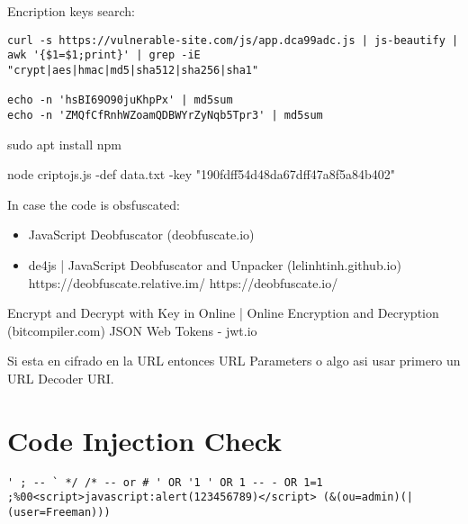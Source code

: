 Encription keys search:
\begin{lstlisting}[numbers=none]
curl -s https://vulnerable-site.com/js/app.dca99adc.js | js-beautify | awk '{$1=$1;print}' | grep -iE  "crypt|aes|hmac|md5|sha512|sha256|sha1"

echo -n 'hsBI69O90juKhpPx' | md5sum 
echo -n 'ZMQfCfRnhWZoamQDBWYrZyNqb5Tpr3' | md5sum
\end{lstlisting}

sudo apt install npm 


node criptojs.js -def data.txt -key "190fdff54d48da67dff47a8f5a84b402"

In case the code is obsfuscated:
\begin{itemize}
	\item JavaScript Deobfuscator (deobfuscate.io)
	\item de4js | JavaScript Deobfuscator and Unpacker (lelinhtinh.github.io)
		https://deobfuscate.relative.im/
         	https://deobfuscate.io/
\end{itemize}

Encrypt and Decrypt with Key in Online | Online Encryption and Decryption (bitcompiler.com)
JSON Web Tokens - jwt.io

Si esta en cifrado en la URL entonces URL Parameters o algo asi usar primero un URL Decoder URI.

\section{Code Injection Check}

\begin{lstlisting}[numbers=none]
' ; -- ` */ /* -- or # ' OR '1 ' OR 1 -- - OR 1=1 ;%00<script>javascript:alert(123456789)</script> (&(ou=admin)(| (user=Freeman)))
\end{lstlisting}

